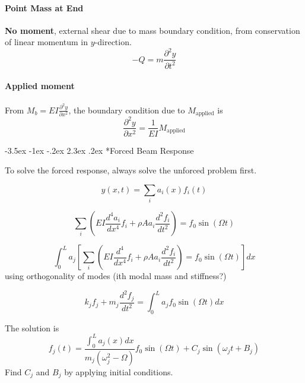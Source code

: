 \documentclass[letterpaper,twocolumn,notitlepage]{article}
\makeatletter
\renewcommand\subsection{\@startsection{section}{1}{\z@}%
 {-3.5ex \@plus-1ex \@minus-.2ex}%
 {2.3ex \@plus.2ex}%
 {\fontsize{8pt}{8pt}\selectfont\sffamily}}
\makeatother
\begin{document}
  \paragraph{Point Mass at End}
  \textbf{No moment}, external shear due to mass boundary condition, from conservation of linear momentum in $y$-direction.
  \begin{equation*}
    \boxed{-Q=m\frac{\partial^{2}y}{\partial t^{2}}}
  \end{equation*}

  \paragraph{Applied moment}
  From $M_{b}=EI\frac{\partial^{2}y}{\partial x^{2}}$, the boundary condition due to $M_{\text{applied}}$ is
  \begin{equation*}
    \boxed{\frac{\partial^{2}y}{\partial x^{2}}=\frac{1}{EI}M_{\text{applied}}}
  \end{equation*}

  \subsection*{Forced Beam Response}

  To solve the forced response, always solve the unforced problem first.

  \begin{equation*}
    y(x,t)=\sum_{i}a_{i}(x)f_{i}(t)
  \end{equation*}

  \begin{equation*}
    \sum_{i}\left(EI\frac{d^{4}a_{i}}{dx^{4}}f_{i}+\rho Aa_{i}\frac{d^{2}f_{i}}{dt^{2}}\right)=f_{0}\sin(\Omega t)
  \end{equation*}

  \begin{equation*}
    \int_{0}^{L}a_{j}\left[\sum_{i}\left(EI\frac{d^{4}}{dx^{4}}f_{i}+\rho Aa_{i}\frac{d^{2}f_{i}}{dt^{2}}\right)=f_{0}\sin(\Omega t)\right]dx
  \end{equation*}
  using orthogonality of modes (ith modal mass and stiffness?)

  \begin{equation*}
    k_{j}f_{j}+m_{j}\frac{d^{2}f_{j}}{dt^{2}}=\int_{0}^{L}a_{j}f_{0}\sin(\Omega t)dx
  \end{equation*}

  The solution is
  \begin{equation*}
    f_{j}(t)=\frac{\int_{0}^{L}a_{j}(x)dx}{m_{j}(\omega_{j}^{2}-\Omega)}f_{0}\sin(\Omega t)+C_{j}\sin(\omega_{j}t+B_{j})
  \end{equation*}
  Find $C_{j}$ and $B_{j}$ by applying initial conditions.
\end{document}
